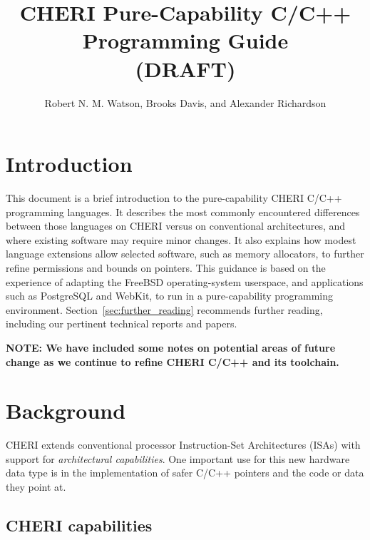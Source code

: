 \documentclass[11pt]{article}
\title{CHERI Pure-Capability C/C++ Programming Guide \\ (DRAFT)}
\author{Robert N. M. Watson, Brooks Davis, and Alexander Richardson}
\begin{document}
\maketitle

\section{Introduction}

This document is a brief introduction to the pure-capability CHERI C/C++
programming languages.
It describes the most commonly encountered differences between those languages
on CHERI versus on conventional architectures, and where existing software may
require minor changes.
It also explains how modest language extensions allow selected software, such
as memory allocators, to further refine permissions and bounds on pointers.
This guidance is based on the experience of adapting the FreeBSD
operating-system userspace, and applications such as PostgreSQL and WebKit, to
run in a pure-capability programming environment.
Section~\ref{sec:further_reading} recommends further reading, including our
pertinent technical reports and papers.

\textbf{NOTE: We have included some notes on potential areas of future change
  as we continue to refine CHERI C/C++ and its toolchain.}

\section{Background}

CHERI extends conventional processor Instruction-Set Architectures (ISAs) with
support for \textit{architectural capabilities}.
One important use for this new hardware data type is in the implementation
of safer C/C++ pointers and the code or data they point at.

\subsection{CHERI capabilities}
\end{document}
